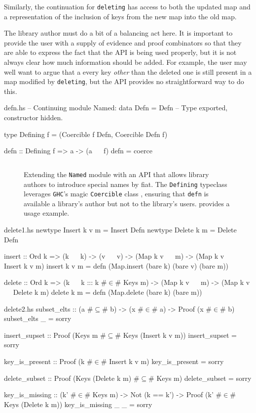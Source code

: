 \documentclass[format=sigplan, review=false, screen=true]{acmart}
\begin{document}
Similarly, the continuation for \texttt{deleting} has access to both the updated map
and a representation of the inclusion of keys from the new map into the old map.

The library author must do a bit of a balancing act here. It is important to provide
the user with a supply of evidence and proof combinators so that they are able to
express the fact that the API is being used properly, but it is not always clear how
much information should be added. For example, the user may well want to argue that a
every key \emph{other} than the deleted one is still present in a map modified by
\texttt{deleting}, but the API provides no straightforward way to do this.

\begin{filecontents*}{defn.hs}
-- Continuing module Named:
data Defn = Defn -- Type exported, constructor hidden.

type Defining f = (Coercible f Defn, Coercible Defn f)

defn :: Defining f => a -> (a ~~ f)
defn = coerce
\end{filecontents*}

\begin{figure}
  \inputminted{haskell}{defn.hs}
  \caption{Extending the \texttt{Named} module with
    an API that allows library authors to introduce
    special names by fiat. The \texttt{Defining} typeclass
    leverages \texttt{GHC}'s magic \texttt{Coercible} class \cite{Breitner:2014:SZC:2692915.2628141},
    ensuring that \texttt{defn} is available a library's author but not
    to the library's users.  provides a usage example.}
\end{figure}

\begin{filecontents*}{delete1.hs}
newtype Insert k v m = Insert Defn
newtype Delete k m   = Delete Defn

insert :: Ord k
       => (k ~~ k)
       -> (v ~~ v)
       -> (Map k v ~~ m)
       -> (Map k v ~~ Insert k v m)
insert k v m =
    defn (Map.insert (bare k) (bare v) (bare m))
       
delete :: Ord k
       => (k ~~ k ::: k #$\in$# Keys m)
       -> (Map k v ~~ m)
       -> (Map k v ~~ Delete k m)
delete k m = defn (Map.delete (bare k) (bare m))
\end{filecontents*}
\begin{filecontents*}{delete2.hs}
subset_elts :: (a #$\subseteq$# b) -> (x #$\in$# a) -> Proof (x #$\in$# b)
subset_elts _ = sorry

insert_supset :: Proof (Keys m #$\subseteq$# Keys (Insert k v m))
insert_supset = sorry

key_is_present :: Proof (k #$\in$# Insert k v m)
key_is_present = sorry

delete_subset :: Proof (Keys (Delete k m) #$\subseteq$# Keys m)
delete_subset = sorry

key_is_missing  :: (k' #$\in$# Keys m)
                -> Not (k == k')
                -> Proof (k' #$\in$# Keys (Delete k m))
key_is_missing _ _ = sorry                
\end{filecontents*}
\end{document}
